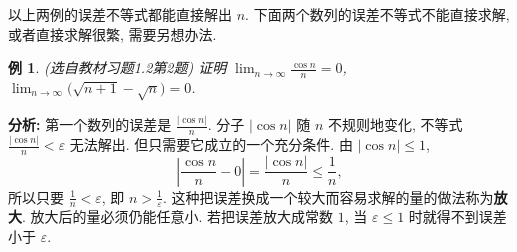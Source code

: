 \documentclass[UTF8,openany]{ctexbook}
\theoremstyle{chinesetextbook}
\newtheorem{example}{例}[section]
\begin{document}
以上两例的误差不等式都能直接解出 $n$. 下面两个数列的误差不等式不能直接求解, 或者直接求解很繁, 需要另想办法.
\begin{example}
\textnormal{(选自教材习题1.2第2题)} 证明 $\displaystyle\lim_{n\to\infty}\frac{\cos n}n=0$, $\displaystyle\lim_{n\to\infty}\bigl(\sqrt{n+1}-\sqrt n\bigr)=0$.
\end{example}
\par\indent\textbf{分析:} 第一个数列的误差是 $\displaystyle\frac{|\cos n|}n$. 分子 $|\cos n|$ 随 $n$ 不规则地变化, 不等式 $\displaystyle\frac{|\cos n|}n<\varepsilon$ 无法解出. 但只需要它成立的一个充分条件. 由 $|\cos n|\le1$,
\[
\left|\frac{\cos n}n-0\right|=\frac{|\cos n|}n\le\frac1n,
\]
所以只要 $\displaystyle\frac1n<\varepsilon$, 即 $\displaystyle n>\frac1\varepsilon$. 这种把误差换成一个较大而容易求解的量的做法称为\textbf{放大}. 放大后的量必须仍能任意小. 若把误差放大成常数 $1$, 当 $\varepsilon\le1$ 时就得不到误差小于 $\varepsilon$.
\end{document}
